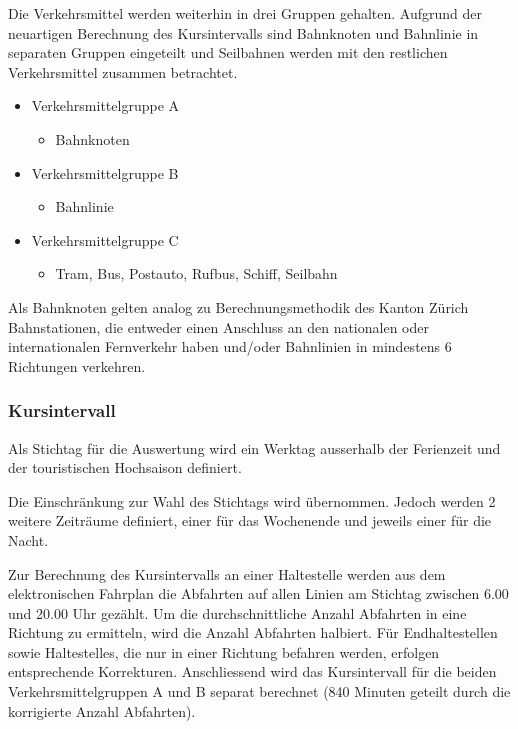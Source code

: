 Die Verkehrsmittel werden weiterhin in drei Gruppen gehalten.
Aufgrund der neuartigen Berechnung des Kursintervalls sind Bahnknoten und Bahnlinie in separaten Gruppen eingeteilt und Seilbahnen werden mit den restlichen Verkehrsmittel zusammen betrachtet.

\begin{itemize}[noitemsep]
    \item Verkehrsmittelgruppe A
    \begin{itemize}
        \item Bahnknoten
    \end{itemize}
    \item Verkehrsmittelgruppe B
    \begin{itemize}
        \item Bahnlinie
    \end{itemize}
    \item Verkehrsmittelgruppe C
    \begin{itemize}
        \item Tram, Bus, Postauto, Rufbus, Schiff, Seilbahn
    \end{itemize}
\end{itemize}

Als Bahnknoten gelten analog zu Berechnungsmethodik des Kanton Zürich Bahnstationen, die entweder einen Anschluss an den nationalen oder internationalen Fernverkehr haben und/oder Bahnlinien in mindestens 6 Richtungen verkehren. 

\subsubsection{Kursintervall}
\label{Zusammenhang zur Berechnungsmethodik ARE:Kursintervall}

\begin{itquote}
Als Stichtag für die Auswertung wird ein Werktag ausserhalb der Ferienzeit und der touristischen Hochsaison definiert.
\end{itquote}

Die Einschränkung zur Wahl des Stichtags wird übernommen.
Jedoch werden 2 weitere Zeiträume definiert, einer für das Wochenende und jeweils einer für die Nacht.

\begin{itquote}
Zur Berechnung des Kursintervalls an einer \gls{Haltestelle} werden aus dem elektronischen Fahrplan die Abfahrten auf allen Linien am Stichtag zwischen 6.00 und 20.00 Uhr gezählt.
Um die durchschnittliche Anzahl Abfahrten in eine Richtung zu ermitteln, wird die Anzahl Abfahrten halbiert.
Für Endhaltestellen sowie \glspl{Haltestelle}, die nur in einer Richtung befahren werden, erfolgen entsprechende Korrekturen.
Anschliessend wird das Kursintervall für die beiden Verkehrsmittelgruppen A und B separat berechnet (840 Minuten geteilt durch die korrigierte Anzahl Abfahrten).
\end{itquote}

